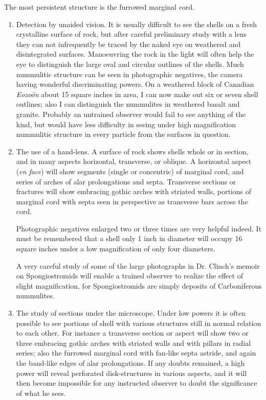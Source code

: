 \documentclass[a4paper, 12pt, oneside, landscape]{article}
\begin{document}
The most persistent structure is the furrowed marginal cord.
\begin{enumerate}
    \item Detection by unaided vision. It is usually difficult to see the shells on a fresh crystalline surface of rock, but after careful preliminary study with a lens they can not infrequently be traced by the naked eye on weathered and disintegrated surfaces. Manoeuvring the rock in the light will often help the eye to distinguish the large oval and circular outlines of the shells. Much nummulitic structure can be seen in photographic negatives, the camera having wonderful discriminating powers. On a weathered block of Canadian \emph{Eozoön} about 15 square inches in area, I can now make out six or seven shell outlines; also I can distinguish the nummulites in weathered basalt and granite. Probably an untrained observer would fail to see anything of the kind, but would have less difficulty in seeing under high magnification nummulitic structure in every particle from the surfaces in question.
    \item The use of a hand-lens. A surface of rock shows shells whole or in section, and in many aspects horizontal, transverse, or oblique. A horizontal aspect (\emph{en face}) will show segments (single or concentric) of marginal cord, and series of arches of alar prolongations and septa.
    Transverse sections or fractures will show embracing gothic arches with striated walls, portions of marginal cord with septa seen in perspective as transverse bars across the cord.

\hspace{5mm}Photographic negatives enlarged two or three times are very helpful indeed. It must be remembered that a shell only 1 inch in diameter will occupy 16 square inches under a low magnification of only four diameters.

\hspace{5mm}A very careful study of some of the large photographs in Dr. Clinch's memoir on Spongiostromids will enable a trained observer to realize the effect of slight magnification, for Spongiostromids are simply deposits of Carboniferous nummulites.
    \item The study of sections under the microscope. Under low powers it is often possible to see portions of shell with various structures still in normal relation to each other. For instance a transverse section or aspect will show two or three embracing gothic arches with striated walls and with pillars in radial series; also the furrowed marginal cord with fan-like septa astride, and again the band-like edges of alar prolongations. If any doubts remained, a high power will reveal perforated disk-structures in various aspects, and it will then become impossible for any instructed observer to doubt the significance of what he sees.
\end{enumerate}
\end{document}
